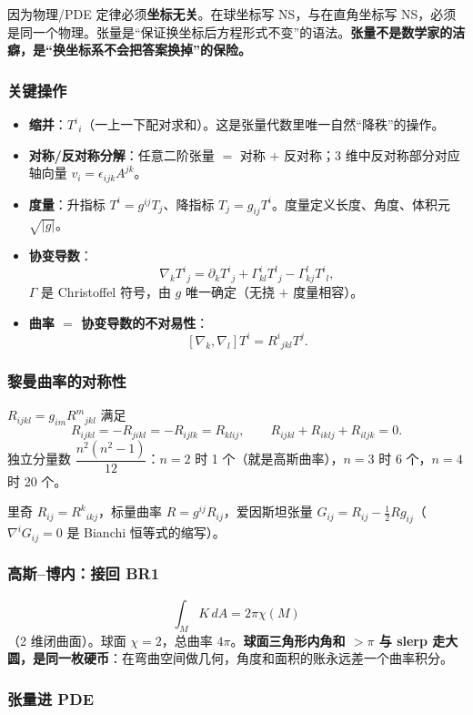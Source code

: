 因为物理/PDE 定律必须\textbf{坐标无关}。在球坐标写 NS，与在直角坐标写 NS，必须是同一个物理。张量是“保证换坐标后方程形式不变”的语法。\textbf{张量不是数学家的洁癖，是“换坐标系不会把答案换掉”的保险。}

\subsubsection{关键操作}

\begin{itemize}
  \item \textbf{缩并}：$T^i{}_i$（一上一下配对求和）。这是张量代数里唯一自然“降秩”的操作。
  \item \textbf{对称/反对称分解}：任意二阶张量 $=$ 对称 $+$ 反对称；3 维中反对称部分对应轴向量 $v_i=\epsilon_{ijk}A^{jk}$。
  \item \textbf{度量}：升指标 $T^i=g^{ij}T_j$、降指标 $T_j=g_{ij}T^i$。度量定义长度、角度、体积元 $\sqrt{|g|}$。
  \item \textbf{协变导数}：
  \[
  \nabla_kT^i{}_j=\partial_kT^i{}_j+\Gamma^i_{kl}T^l{}_j-\Gamma^l_{kj}T^i{}_l ,
  \]
  $\Gamma$ 是 Christoffel 符号，由 $g$ 唯一确定（无挠 $+$ 度量相容）。
  \item \textbf{曲率 $=$ 协变导数的不对易性}：
  \[
  [\nabla_k,\nabla_l]T^i=R^i{}_{jkl}T^j .
  \]
\end{itemize}

\subsubsection{黎曼曲率的对称性}

$R_{ijkl}=g_{im}R^m{}_{jkl}$ 满足
\[
R_{ijkl}=-R_{jikl}=-R_{ijlk}=R_{klij},\qquad
R_{ijkl}+R_{iklj}+R_{iljk}=0 .
\]
独立分量数 $\dfrac{n^2(n^2-1)}{12}$：$n=2$ 时 1 个（就是高斯曲率），$n=3$ 时 6 个，$n=4$ 时 20 个。

里奇 $R_{ij}=R^k{}_{ikj}$，标量曲率 $R=g^{ij}R_{ij}$，爱因斯坦张量 $G_{ij}=R_{ij}-\frac12Rg_{ij}$（$\nabla^iG_{ij}=0$ 是 Bianchi 恒等式的缩写）。

\subsubsection{高斯--博内：接回 BR1}

\[
\int_M K\,dA=2\pi\chi(M)
\]
（2 维闭曲面）。球面 $\chi=2$，总曲率 $4\pi$。\textbf{球面三角形内角和 $>\pi$ 与 slerp 走大圆，是同一枚硬币}：在弯曲空间做几何，角度和面积的账永远差一个曲率积分。

\subsubsection{张量进 PDE}

